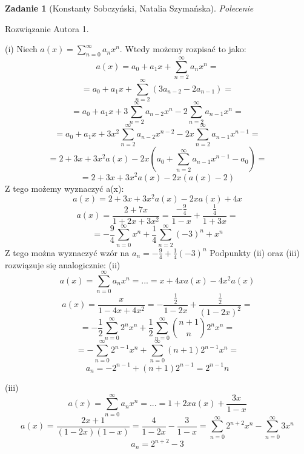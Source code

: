 \documentclass{mwart}
\newtheorem{zad}{Zadanie}[section]
\begin{document}
\begin{zad}[Konstanty Sobczyński, Natalia Szymańska]
    Polecenie
\end{zad}
\begin{mdframed}
    Rozwiązanie Autora 1.
\end{mdframed}
\begin{mdframed}
    (i) Niech $a(x) = \sum_{n=0}^{\infty} a_n x^n$. Wtedy możemy rozpisać to jako: \newline
\[a(x) = a_0 + a_1 x + \sum_{n=2}^{\infty}a_n x^n =\]
\[=a_0 + a_1 x + \sum_{n=2}^{\infty}(3a_{n-2} - 2a_{n-1})=\]
\[=a_0 + a_1 x + 3\sum_{n=2}^{\infty}{a_{n-2}x^n} - 2\sum_{n=2}^{\infty}{a_{n-1}x^n}=\]
\[= a_0 + a_1 x +3x^2\sum_{n=2}^{\infty}{a_{n-2}x^{n-2}} - 2x\sum_{n=2}^{\infty}{a_{n-1}x^{n-1}} = \]
\[= 2 + 3x + 3x^2a(x) - 2x(a_0 + \sum_{n=2}^{\infty}{a_{n-1}x^{n-1}} - a_0) =\]
\[=2 + 3x + 3x^2a(x) -2x(a(x) -2)\]
Z tego możemy wyznaczyć a(x):
\[a(x) = 2 + 3x + 3x^2a(x) -2xa(x) +4x\]
\[a(x) = \frac{2+7x}{1+2x+3x^2} = \frac{-\frac{9}{4}}{1-x} + \frac{\frac{1}{4}}{1+3x}=\]
\[=-\frac{9}{4}\sum_{n=0}^{\infty}x^n +\frac{1}{4}\sum_{n=2}^{\infty}(-3)^n+x^n\]
Z tego można wyznaczyć wzór na $a_n= -\frac{9}{4}+ \frac{1}{4}(-3)^n$
\newline
Podpunkty (ii) oraz (iii) rozwiązuje się analogicznie:\newline
(ii)  \[a(x) = \sum_{n=0}^{\infty} a_n x^n = ... = x + 4xa(x) -4x^2a(x)\]
\[a(x) = \frac{x}{1-4x+4x^2} = -\frac{\frac{1}{2}}{1-2x}+\frac{\frac{1}{2}}{(1-2x)^2} =\]
\[=-\frac{1}{2}\sum_{n=0}^{\infty}2^nx^n + \frac{1}{2}\sum_{n=0}^{\infty}{{n+1}\choose{n}}2^nx^n= \]
\[=-\sum_{n=0}^{\infty}2^{n-1}x^n + \sum_{n=0}^{\infty}({n+1})2^{n-1}x^n=\]
\[a_n=-2^{n-1}+(n+1)2^{n-1} = 2^{n-1}n\]
\newline

(iii)
\[a(x) = \sum_{n=0}^{\infty} a_n x^n = ... = 1+2xa(x) + \frac{3x}{1-x}\]
\[a(x) = \frac{2x+1}{(1-2x)(1-x)} = \frac{4}{1-2x} - \frac{3}{1-x} = \sum_{n=0}^{\infty}2^{n+2}x^n - \sum_{n=0}^{\infty}3x^n\]
\[a_n = 2^{n+2} -3\]
\end{mdframed}
\end{document}
